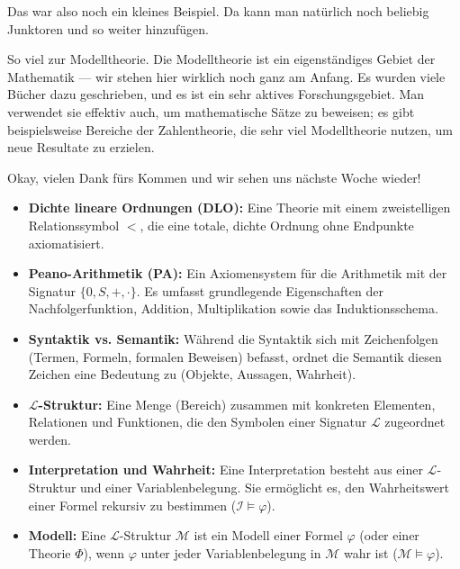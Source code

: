 \begin{spoken-clean}[01:14:03 - 01:27:03]
Das war also noch ein kleines Beispiel. Da kann man natürlich noch beliebig Junktoren und so weiter hinzufügen.

So viel zur Modelltheorie. Die Modelltheorie ist ein eigenständiges Gebiet der Mathematik --- wir stehen hier wirklich noch ganz am Anfang. Es wurden viele Bücher dazu geschrieben, und es ist ein sehr aktives Forschungsgebiet. Man verwendet sie effektiv auch, um mathematische Sätze zu beweisen; es gibt beispielsweise Bereiche der Zahlentheorie, die sehr viel Modelltheorie nutzen, um neue Resultate zu erzielen.

Okay, vielen Dank fürs Kommen und wir sehen uns nächste Woche wieder!
\end{spoken-clean}

\begin{nice-box}
\begin{itemize}
    \item \textbf{Dichte lineare Ordnungen (DLO):} Eine Theorie mit einem zweistelligen Relationssymbol $<$, die eine totale, dichte Ordnung ohne Endpunkte axiomatisiert.
    \item \textbf{Peano-Arithmetik (PA):} Ein Axiomensystem für die Arithmetik mit der Signatur $\{0, S, +, \cdot\}$. Es umfasst grundlegende Eigenschaften der Nachfolgerfunktion, Addition, Multiplikation sowie das Induktionsschema.
    \item \textbf{Syntaktik vs. Semantik:} Während die Syntaktik sich mit Zeichenfolgen (Termen, Formeln, formalen Beweisen) befasst, ordnet die Semantik diesen Zeichen eine Bedeutung zu (Objekte, Aussagen, Wahrheit).
    \item \textbf{$\mathcal{L}$-Struktur:} Eine Menge (Bereich) zusammen mit konkreten Elementen, Relationen und Funktionen, die den Symbolen einer Signatur $\mathcal{L}$ zugeordnet werden.
    \item \textbf{Interpretation und Wahrheit:} Eine Interpretation besteht aus einer $\mathcal{L}$-Struktur und einer Variablenbelegung. Sie ermöglicht es, den Wahrheitswert einer Formel rekursiv zu bestimmen ($\mathcal{I} \models \varphi$).
    \item \textbf{Modell:} Eine $\mathcal{L}$-Struktur $\mathcal{M}$ ist ein Modell einer Formel $\varphi$ (oder einer Theorie $\Phi$), wenn $\varphi$ unter jeder Variablenbelegung in $\mathcal{M}$ wahr ist ($\mathcal{M} \models \varphi$).
\end{itemize}
\end{nice-box}